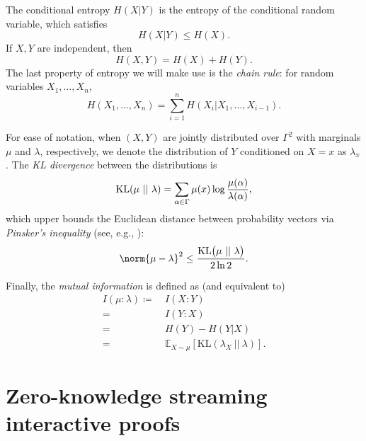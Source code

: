 \documentclass[a4paper,UKenglish,cleveref, autoref, thm-restate]{lipics-v2021}
\theoremstyle{definition}
\newcommand{\E}{\mathbb E}
\newcommand{\alphabet}{\Gamma}
\def\symbol#1{
    \ifnum#1=1
        \alpha
    \else
    \ifnum#1=2
        \beta
    \else
    \ifnum#1=3
        \gamma
    \fi\fi\fi
}
\begin{document}
    The conditional entropy $H(X|Y)$ is the entropy of the conditional random variable, which satisfies
    \begin{equation}
    \label{eq:entropy-conditioning}
        H(X|Y) \leq H(X).
    \end{equation}
    If $X,Y$ are independent, then
    \begin{equation}
    \label{eq:entropy-independence}
        H(X,Y) = H(X) + H(Y).
    \end{equation}
    The last property of entropy we will make use is the \emph{chain rule}: for random variables $X_1, \ldots, X_n$,
    \begin{equation}
        \label{eq:chain-rule-entropy}
        H(X_1, \ldots, X_n) = \sum_{i = 1}^n H(X_i|X_1, \ldots, X_{i-1}).
    \end{equation}

    For ease of notation, when $(X, Y)$ are jointly distributed over $\alphabet^2$ with marginals $\mu$ and $\lambda$, respectively, we denote the distribution of $Y$ conditioned on $X = x$ as $\lambda_x$. The \emph{KL divergence} between the distributions is
    \begin{equation}
        \label{eq:kl-divergence}
        \mathrm{KL}(\mu ~||~ \lambda) = \sum_{\symbol1 \in \alphabet} \mu(x) \log \frac{\mu(\symbol1)}{\lambda(\symbol1)},
    \end{equation}
    which upper bounds the Euclidean distance between probability vectors via \emph{Pinsker's inequality} (see, e.g., \cite{BLM13}):
    \begin{equation}
    \label{eq:pinsker}
    \norm{\mu - \lambda}^2 \leq \frac{\mathrm{KL}\big(\mu ~||~ \lambda\big)}{2 \ln 2}.
\end{equation}
    
    Finally, the \emph{mutual information} is defined as (and equivalent to)
    \begin{align}
        \label{eq:mutual-information}
        I(\mu:\lambda) \coloneqq&~ I(X:Y)\\
        =&~ I(Y:X) \nonumber\\
        =&~ H(Y) - H(Y|X) \nonumber\\
        =&~ \E_{X \sim \mu}[\mathrm{KL}(\lambda_X ~||~ \lambda)] \nonumber.
    \end{align}


\section{Zero-knowledge streaming interactive proofs}
\label{sec:streaming-zk}
\end{document}

